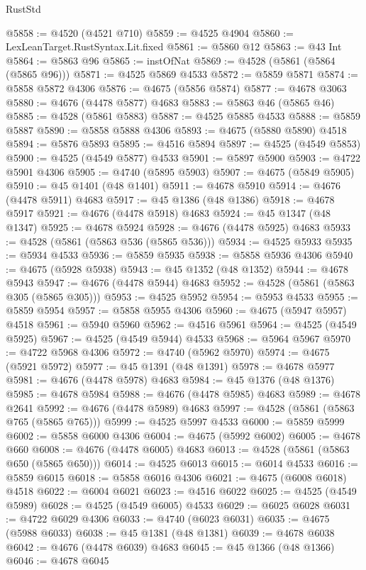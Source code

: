 \begin{lexlean}{RustStd}
\begin{coremodule}
@5858 := @4520 (@4521 @710)
@5859 := @4525 @4904
@5860 := LexLeanTarget.RustSyntax.Lit.fixed
@5861 := @5860 @12
@5863 := @43 Int
@5864 := @5863 @96
@5865 := instOfNat
@5869 := @4528 (@5861 (@5864 (@5865 @96)))
@5871 := @4525 @5869 @4533
@5872 := @5859 @5871
@5874 := @5858 @5872 @4306
@5876 := @4675 (@5856 @5874)
@5877 := @4678 @3063
@5880 := @4676 (@4478 @5877) @4683
@5883 := @5863 @46 (@5865 @46)
@5885 := @4528 (@5861 @5883)
@5887 := @4525 @5885 @4533
@5888 := @5859 @5887
@5890 := @5858 @5888 @4306
@5893 := @4675 (@5880 @5890) @4518
@5894 := @5876 @5893
@5895 := @4516 @5894
@5897 := @4525 (@4549 @5853)
@5900 := @4525 (@4549 @5877) @4533
@5901 := @5897 @5900
@5903 := @4722 @5901 @4306
@5905 := @4740 (@5895 @5903)
@5907 := @4675 (@5849 @5905)
@5910 := @45 @1401 (@48 @1401)
@5911 := @4678 @5910
@5914 := @4676 (@4478 @5911) @4683
@5917 := @45 @1386 (@48 @1386)
@5918 := @4678 @5917
@5921 := @4676 (@4478 @5918) @4683
@5924 := @45 @1347 (@48 @1347)
@5925 := @4678 @5924
@5928 := @4676 (@4478 @5925) @4683
@5933 := @4528 (@5861 (@5863 @536 (@5865 @536)))
@5934 := @4525 @5933
@5935 := @5934 @4533
@5936 := @5859 @5935
@5938 := @5858 @5936 @4306
@5940 := @4675 (@5928 @5938)
@5943 := @45 @1352 (@48 @1352)
@5944 := @4678 @5943
@5947 := @4676 (@4478 @5944) @4683
@5952 := @4528 (@5861 (@5863 @305 (@5865 @305)))
@5953 := @4525 @5952
@5954 := @5953 @4533
@5955 := @5859 @5954
@5957 := @5858 @5955 @4306
@5960 := @4675 (@5947 @5957) @4518
@5961 := @5940 @5960
@5962 := @4516 @5961
@5964 := @4525 (@4549 @5925)
@5967 := @4525 (@4549 @5944) @4533
@5968 := @5964 @5967
@5970 := @4722 @5968 @4306
@5972 := @4740 (@5962 @5970)
@5974 := @4675 (@5921 @5972)
@5977 := @45 @1391 (@48 @1391)
@5978 := @4678 @5977
@5981 := @4676 (@4478 @5978) @4683
@5984 := @45 @1376 (@48 @1376)
@5985 := @4678 @5984
@5988 := @4676 (@4478 @5985) @4683
@5989 := @4678 @2641
@5992 := @4676 (@4478 @5989) @4683
@5997 := @4528 (@5861 (@5863 @765 (@5865 @765)))
@5999 := @4525 @5997 @4533
@6000 := @5859 @5999
@6002 := @5858 @6000 @4306
@6004 := @4675 (@5992 @6002)
@6005 := @4678 @660
@6008 := @4676 (@4478 @6005) @4683
@6013 := @4528 (@5861 (@5863 @650 (@5865 @650)))
@6014 := @4525 @6013
@6015 := @6014 @4533
@6016 := @5859 @6015
@6018 := @5858 @6016 @4306
@6021 := @4675 (@6008 @6018) @4518
@6022 := @6004 @6021
@6023 := @4516 @6022
@6025 := @4525 (@4549 @5989)
@6028 := @4525 (@4549 @6005) @4533
@6029 := @6025 @6028
@6031 := @4722 @6029 @4306
@6033 := @4740 (@6023 @6031)
@6035 := @4675 (@5988 @6033)
@6038 := @45 @1381 (@48 @1381)
@6039 := @4678 @6038
@6042 := @4676 (@4478 @6039) @4683
@6045 := @45 @1366 (@48 @1366)
@6046 := @4678 @6045

\end{coremodule}
\end{lexlean}
